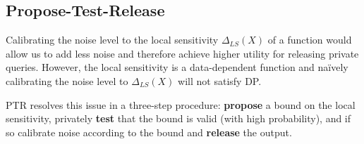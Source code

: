 \subsection{Propose-Test-Release}
Calibrating the noise level to the local sensitivity $\Delta_{LS}(X)$ of a function would allow us to add less noise and therefore achieve higher utility for releasing private queries. However, the local sensitivity is a data-dependent function and na\"ively calibrating the noise level to $\Delta_{LS}(X)$ will not satisfy DP.

PTR resolves this issue in a three-step procedure: \textbf{propose} a bound on the local sensitivity, privately \textbf{test} that the bound is valid (with high probability), and if so calibrate noise according to the bound and \textbf{release} the output.

